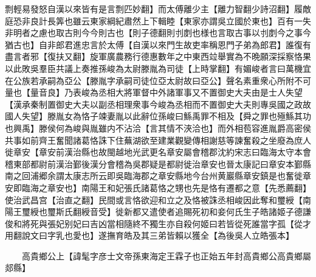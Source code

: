 剽輕易發怒自漢以來皆有是言剽匹妙翻】而太傅離少主【離力智翻少詩沼翻】履敵庭恐非良計長筭也雖云東家綱紀肅然上下輯睦【東家亦謂吳立國於東也】百有一失非明者之慮也取古則今今則古也【則子德翻則刌剫也様也言取古事以刌剫今之事今猶古也】自非郎君進忠言於太傅【自漢以來門生故吏率稱恩門子弟為郎君】誰復有盡言者邪【復扶又翻】旋軍廣農務行德惠數年之中東西竝舉實為不晩願深採察恪果以此敗吳羣臣共議上奏推孫峻為太尉滕胤為司徒【上時掌翻】有媚峻者言曰萬機宜在公族若承嗣為亞公【滕胤字承嗣司徒位亞太尉故曰亞公】聲名素重衆心所附不可量也【量音良】乃表峻為丞相大將軍督中外諸軍事又不置御史大夫由是士人失望【漢承秦制置御史大夫以副丞相理衆事今峻為丞相而不置御史大夫則專吳國之政故國人失望】滕胤女為恪子竦妻胤以此辭位孫峻曰鯀禹罪不相及【舜之罪也殛鯀其功也興禹】滕侯何為峻與胤雖内不沾洽【言其情不浹洽也】而外相苞容進胤爵高密侯共事如前齊王奮聞諸葛恪誅下住蕪湖欲至建業觀變傳相謝慈等諫奮殺之坐廢為庶人徙章安【章安前漢治縣也故閩越地光武更名章安屬會稽郡沈約宋志曰臨海太守本會稽東部都尉前漢治鄞後漢分會稽為吳郡疑是都尉徙治章安也晉太康記曰章安本鄞縣南之回浦郷余謂太康志所云即吳臨海郡之章安縣地今台州黄巖縣章安鎮是也奮徙章安即臨海之章安也】南陽王和妃張氏諸葛恪之甥也先是恪有遷都之意【先悉薦翻】使治武昌宫【治直之翻】民間或言恪欲迎和立之及恪被誅丞相峻因此奪和璽綬【南陽王璽綬也璽斯氏翻綬音受】徙新都又遣使者追賜死初和妾何氏生子皓諸姬子德謙俊和將死與張妃别妃曰吉凶當相隨終不獨生亦自殺何姬曰若皆從死誰當字孤【從才用翻說文曰字乳也愛也】遂撫育皓及其三弟皆賴以獲全【為後吳人立皓張本】

　　高貴鄉公上【諱髦字彦士文帝孫東海定王霖子也正始五年封高貴鄉公高貴鄉屬郯縣】

